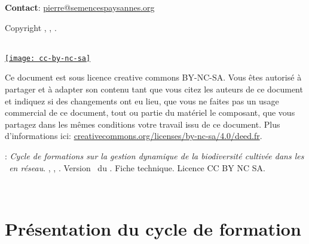 \noindent\up{*} \textbf{Contact}: \href{mailto:pierre@semencespaysannes.org}{\textcolor{mln-green} {pierre@semencespaysannes.org}}

\normalsize

\vfill

\begin{center}
Copyright \RSP, \INRA, \ITAB.

~\\

\href{http://creativecommons.org/licenses/by-nc-sa/4.0/deed.fr}{\texttt{[image: cc-by-nc-sa]}}
\end{center}

\small
Ce document est sous licence creative commons BY-NC-SA.
Vous êtes autorisé à partager et à adapter son contenu tant 
que vous citez les auteurs de ce document et indiquez si des changements ont eu lieu, 
que vous ne faites pas un usage commercial de ce document, tout ou partie du matériel le composant,
que vous partagez dans les mêmes conditions votre travail issu de ce document. 
Plus d'informations ici: \url{creativecommons.org/licenses/by-nc-sa/4.0/deed.fr}.

\vfill

:
\textit{
Cycle de formations sur la gestion dynamique de la biodiversité cultivée dans les
\MSPs~en réseau}.
\RSP, \INRA, \ITAB.
Version \versionCF~du \dateversionCF.
Fiche technique.
Licence CC BY NC SA.


\newpage ~\\ \newpage \tableofcontents \newpage \pagestyle{plain}

\chapter{Présentation du cycle de formation}
\startcontents[chapters]









%
% 
% 
%
%
%
%
%
% 
%
% 
% 
% 

